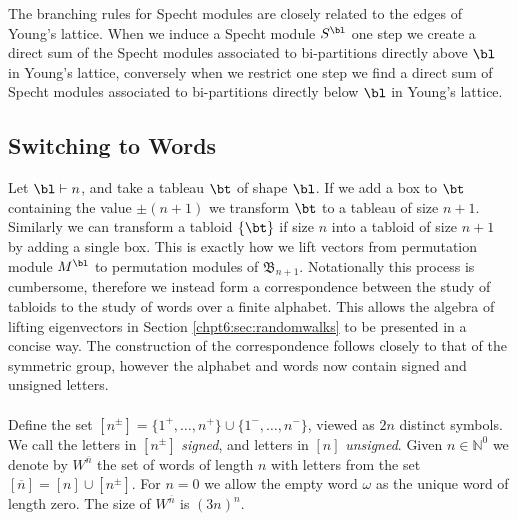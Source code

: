 \documentclass[11pt]{report}
\begin{document}
The branching rules for Specht modules are closely related to the edges of Young's lattice. When we induce a Specht module $S^{\bl}$ one step we create a direct sum of the Specht modules associated to bi-partitions directly above $\bl$ in Young's lattice, conversely when we restrict one step we find a direct sum of Specht modules associated to bi-partitions directly below $\bl$ in Young's lattice.



\subsection{Switching to Words}


Let $\bl \vdash n$, and take a tableau $\bt $ of shape $\bl$. If we add a box to $\bt$ containing the value $\pm(n+1)$ we transform $\bt$ to a tableau of size $n+1$. Similarly we can transform a tabloid $\{\bt\}$ if size $n$ into a tabloid of size $n+1$ by adding a single box. This is exactly how we lift vectors from permutation module $M^{\bl}$ to permutation modules of $\mathfrak{B}_{n+1}$. Notationally this process is cumbersome, therefore we instead form a correspondence between the study of tabloids to the study of words over a finite alphabet. This allows the algebra of lifting eigenvectors in Section \ref{chpt6:sec:randomwalks} to be presented in a concise way. The construction of the correspondence follows closely to that of the symmetric group, however the alphabet and words now contain signed and unsigned letters. 


\paragraph{}
Define the set $[n^{\pm}] = \{1^{+}, \ldots, n^{+}\} \cup \{1^{-}, \ldots, n^{-}\}$, viewed as $2n$ distinct symbols.  We call the letters in $[n^{\pm}]$ \emph{signed}, and letters in $[n]$  \emph{unsigned}.
Given $n\in \mathbb{N}^{0}$ we denote by $W^{\overline{n}}$ the set of words of length $n$ 
with letters from the set $[\overline{n}] = [n] \cup [n^{\pm}]$. For $n=0$ we allow the empty word $\omega$ as the unique word of length zero. The size of $W^{\overline{n}}$ is $(3 n)^{n}$. 
\end{document}
